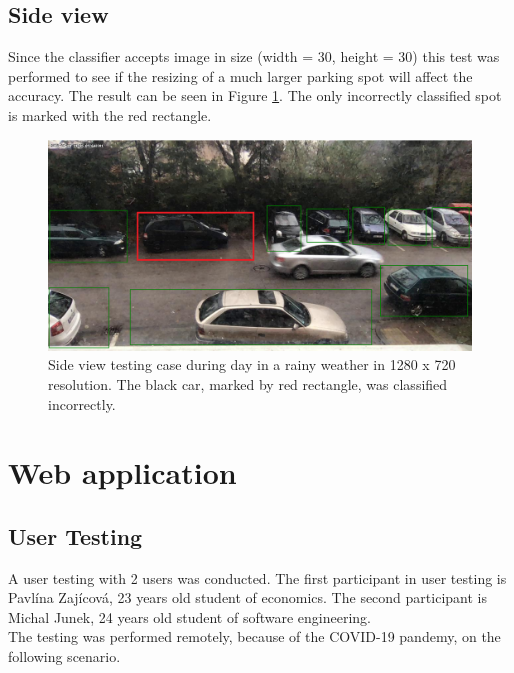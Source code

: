 \documentclass[thesis=M,english]{FITthesis}[2019/03/06]
\begin{document}
\subsection{Side view}
Since the classifier accepts image in size (width = 30, height = 30) this test was performed to see if the resizing of a much larger parking spot will affect the accuracy. The result can be seen in Figure \ref{label:test_side}. The only incorrectly classified spot is marked with the red rectangle.
\begin{figure}[ht!]
	\centering
	\includegraphics[width=\linewidth]{imgs/test-sideview.png}
	\caption{Side view testing case during day in a rainy weather in 1280 x 720 resolution.  The black car, marked by red rectangle, was classified incorrectly.}
	\label{label:test_side}
\end{figure}


\section{Web application}
\subsection{User Testing}
A user testing with 2 users was conducted. The first participant in user testing is Pavlína Zajícová, 23 years old student of economics. The second participant is Michal Junek, 24 years old student of software engineering.\\

The testing was performed remotely, because of the COVID-19 pandemy, on the following scenario.
\end{document}
